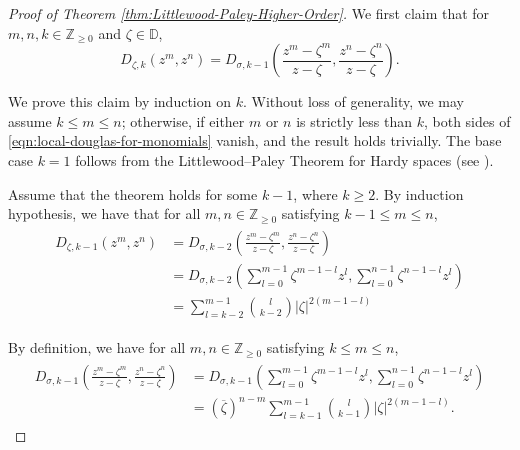 \documentclass[10pt,oneside,reqno]{amsart}
\theoremstyle{definition}
\theoremstyle{remark}
\newcommand{\abs}[1]{\left\lvert #1 \right\rvert}
\renewcommand{\le}{\leqslant}
\renewcommand{\ge}{\geqslant}
\newcommand{\Z}{\mathbb Z}
\newcommand{\D}{\mathbb D}
\numberwithin{equation}{section}
\begin{document}
\begin{proof}[Proof of Theorem \ref{thm:Littlewood-Paley-Higher-Order}]
        We first claim that for $m, n, k \in \Z_{\ge 0}$ and $\zeta \in \D$,  
    \begin{equation}  
        D_{\zeta, k} (z^m, z^n) = D_{\sigma, k-1} \left( \frac{z^m - \zeta^m}{z-\zeta}, \frac{z^n - \zeta^n}{z-\zeta} \right).  
        \label{eqn:local-douglas-for-monomials}  
    \end{equation}  
    
    We prove this claim by induction on $k$. Without loss of generality, we may assume $k \le m \le n$; otherwise, if either $m$ or $n$ is strictly less than $k$, both sides of \eqref{eqn:local-douglas-for-monomials} vanish, and the result holds trivially. The base case $k = 1$ follows from the Littlewood--Paley Theorem for Hardy spaces (see \cite[Chapter VI, Lemma 3.1]{GarnettBAF}).

    Assume that the theorem holds for some $k-1$, where $k \ge 2$. By induction hypothesis, we have that for all $m, n \in \mathbb Z _{\ge 0}$ satisfying $k-1 \le m \le n$,
    \begin{align}
        \begin{split}
            D_{\zeta, k-1} (z^m, z^n) &= D_{\sigma, k-2} \left( \frac{z^m - \zeta^m}{z-\zeta}, \frac{z^n - \zeta^n}{z-\zeta} \right) \\
            &= D_{\sigma, k-2} \left( \sum_{l=0}^{m-1} \zeta ^{m-1-l} z^{l}, \sum_{l=0}^{n-1} \zeta ^{n-1-l} z^{l} \right) \\
            &= \sum_{l=k-2}^{m-1} \binom{l}{k-2} \abs{\zeta}^{2\left( m-1-l \right)}
        \end{split}
        \label{split:ind-hypo}
    \end{align}
    
    By definition, we have for all $m, n \in \mathbb Z _{\ge 0}$ satisfying $k \le m \le n$,
    \begin{align}
    \begin{split}
        D_{\sigma, k-1} \left( \frac{z^m - \zeta ^m}{z-\zeta}, \frac{z^n - \zeta ^n}{z-\zeta} \right) &= D_{\sigma, k-1} \left( \sum_{l=0}^{m-1} \zeta^{m-1-l} z^{l}, \sum_{l=0}^{n-1} \zeta^{n-1-l} z^{l} \right) \\
        &=  \left( \overline{\zeta} \right)^{n-m} \sum_{l=k-1}^{m-1} \binom{l}{k-1} \abs{\zeta}^{2\left( m-1-l \right)}.   
    \end{split}
    \label{split:eq2}
    \end{align} 


\end{proof}
\end{document}

